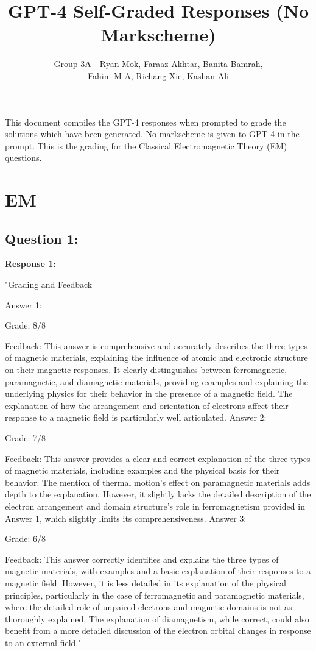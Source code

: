 \documentclass[a4paper,11pt]{article}
\begin{document}
\title{GPT-4 Self-Graded Responses (No Markscheme)}
\author{Group 3A - Ryan Mok, Faraaz Akhtar, Banita Bamrah, \\ Fahim M A, Richang Xie, Kashan Ali }
\date{}
\maketitle

This document compiles the GPT-4 responses when prompted to grade the solutions which have been generated. No markscheme is given to GPT-4 in the prompt. This is the grading for the Classical Electromagnetic Theory (EM) questions. 

\section{EM}

\subsection*{Question 1:}

\textbf{Response 1:}

"Grading and Feedback

Answer 1:

Grade: 8/8

Feedback: This answer is comprehensive and accurately describes the three types of magnetic materials, explaining the influence of atomic and electronic structure on their magnetic responses. It clearly distinguishes between ferromagnetic, paramagnetic, and diamagnetic materials, providing examples and explaining the underlying physics for their behavior in the presence of a magnetic field. The explanation of how the arrangement and orientation of electrons affect their response to a magnetic field is particularly well articulated.
Answer 2:

Grade: 7/8

Feedback: This answer provides a clear and correct explanation of the three types of magnetic materials, including examples and the physical basis for their behavior. The mention of thermal motion's effect on paramagnetic materials adds depth to the explanation. However, it slightly lacks the detailed description of the electron arrangement and domain structure's role in ferromagnetism provided in Answer 1, which slightly limits its comprehensiveness.
Answer 3:

Grade: 6/8

Feedback: This answer correctly identifies and explains the three types of magnetic materials, with examples and a basic explanation of their responses to a magnetic field. However, it is less detailed in its explanation of the physical principles, particularly in the case of ferromagnetic and paramagnetic materials, where the detailed role of unpaired electrons and magnetic domains is not as thoroughly explained. The explanation of diamagnetism, while correct, could also benefit from a more detailed discussion of the electron orbital changes in response to an external field."
\end{document}
